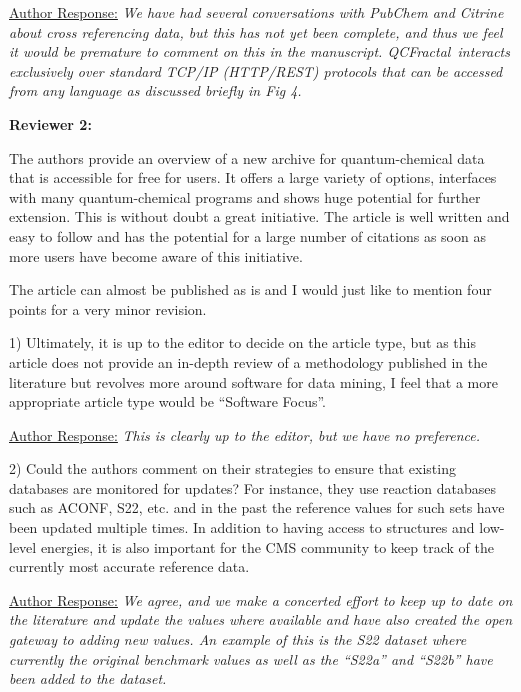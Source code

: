 \documentclass[12pt]{article}
\newcommand{\qcfN}{QCFractal}
\begin{document}
\noindent \underline{Author Response:} \textit{We have had several
conversations with PubChem and Citrine about cross referencing data, but this
has not yet been complete, and thus we feel it would be premature to comment
on this in the manuscript.  \qcfN~interacts exclusively over standard
TCP/IP (HTTP/REST) protocols that can be accessed from any language as
discussed briefly in Fig 4.}

\noindent\makebox[\linewidth]{\rule{\linewidth}{0.4pt}}

\noindent
\textbf{Reviewer 2:}

\noindent
The authors provide an overview of a new archive for quantum-chemical data that is accessible for free for users. It offers a large variety of options, interfaces with many quantum-chemical programs and shows huge potential for further extension. This is without doubt a great initiative. The article is well written and easy to follow and has the potential for a large number of citations as soon as more users have become aware of this initiative. 

\noindent
The article can almost be published as is and I would just like to mention four points for a very minor revision.

1) Ultimately, it is up to the editor to decide on the article type, but as this article does not provide an in-depth review of a methodology published in the literature but revolves more around software for data mining, I feel that a more appropriate article type would be “Software Focus”.

\noindent \underline{Author Response:} \textit{This is clearly up to the
editor, but we have no preference.}

2) Could the authors comment on their strategies to ensure that existing databases are monitored for updates? For instance, they use reaction databases such as ACONF, S22, etc. and in the past the reference values for such sets have been updated multiple times. In addition to having access to structures and low-level energies, it is also important for the CMS community to keep track of the currently most accurate reference data.

\noindent \underline{Author Response:} \textit{We agree, and we make a
concerted effort to keep up to date on the literature and update the values
where available and have also created the open gateway to adding new values.
An example of this is the S22 dataset where currently the original benchmark
values as well as the ``S22a'' and ``S22b'' have been added to the dataset.}
\end{document}
